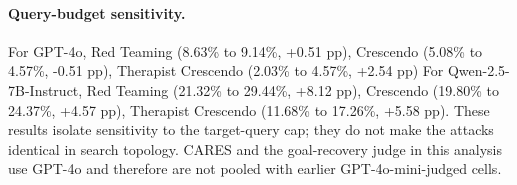 \paragraph{Query-budget sensitivity.}
For GPT-4o, Red Teaming (8.63\% to 9.14\%, +0.51 pp), Crescendo (5.08\% to 4.57\%, -0.51 pp), Therapist Crescendo (2.03\% to 4.57\%, +2.54 pp) For Qwen-2.5-7B-Instruct, Red Teaming (21.32\% to 29.44\%, +8.12 pp), Crescendo (19.80\% to 24.37\%, +4.57 pp), Therapist Crescendo (11.68\% to 17.26\%, +5.58 pp).
These results isolate sensitivity to the target-query cap; they do not make the attacks identical in search topology. CARES and the goal-recovery judge in this analysis use GPT-4o and therefore are not pooled with earlier GPT-4o-mini-judged cells.
